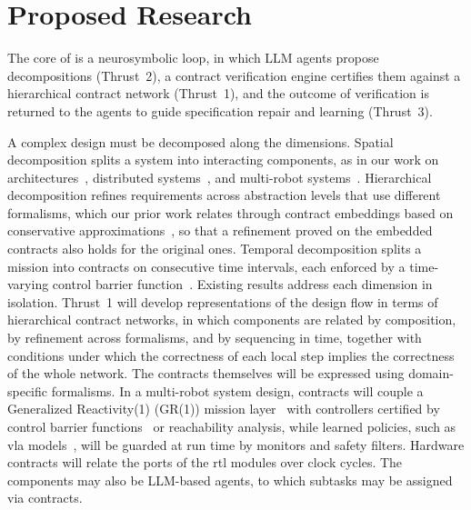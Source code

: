 \section{Proposed Research}

The core of \sysname is a neurosymbolic loop, in which LLM agents propose decompositions (Thrust~2), a contract verification engine certifies them against a hierarchical contract network (Thrust~1), and the outcome of verification is returned to the agents to guide specification repair and learning (Thrust~3).

 A complex design must be decomposed along the dimensions. Spatial decomposition splits a system into interacting components, as in our work on architectures~\cite{xiao2024contrarc}, distributed systems~\cite{xiao2026memocode}, and multi-robot systems~\cite{xiao2026acies}. Hierarchical decomposition refines requirements across abstraction levels that use different formalisms, which our prior work relates through contract embeddings based on conservative approximations~\cite{naik2024contract}{\cite{wang2022hierarchical}}, so that a refinement proved on the embedded contracts also holds for the original ones. Temporal decomposition splits a mission into contracts on consecutive time intervals, each enforced by a time-varying control barrier function~\cite{waqas2022cbf}. Existing results address each dimension in isolation. Thrust~1 will {develop representations of the design flow in terms of hierarchical contract networks}, in which components are related by composition, by refinement across formalisms, and by sequencing in time, together with conditions under which the correctness of each local step implies the correctness of the whole network. {The contracts themselves will be expressed using domain-specific formalisms. In a multi-robot system design, contracts will couple a Generalized Reactivity(1) (GR(1)) mission layer~\cite{bloem2012gr1} with controllers certified by control barrier functions~\cite{ames2019cbf} or reachability analysis, while learned policies, such as \gls{vla} models~\cite{kim2024openvla}, will be guarded at run time by monitors and safety filters. Hardware contracts will relate the ports of the \gls{rtl} modules over clock cycles. The components may also be LLM-based agents, to which subtasks may be assigned via contracts.}

